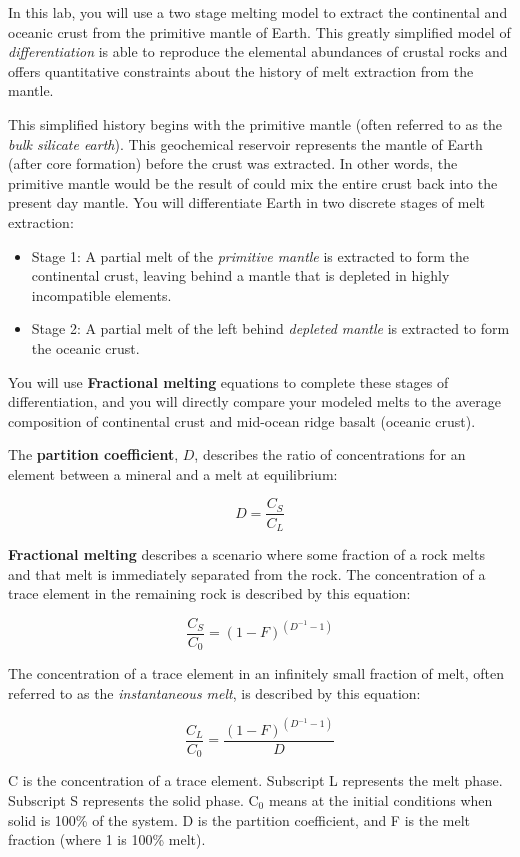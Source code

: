 \noindent In this lab, you will use a two stage melting model to extract the continental and oceanic crust from the primitive mantle of Earth. This greatly simplified model of \emph{differentiation} is able to reproduce the elemental abundances of crustal rocks and offers quantitative constraints about the history of melt extraction from the mantle.

\medskip

\noindent This simplified history begins with the primitive mantle (often referred to as the \emph{bulk silicate earth}). This geochemical reservoir represents the mantle of Earth (after core formation) before the crust was extracted. In other words, the primitive mantle would be the result of could mix the entire crust back into the present day mantle. You will differentiate Earth in two discrete stages of melt extraction:

\begin{itemize}
	\item Stage 1: A partial melt of the \emph{primitive mantle} is extracted to form the continental crust, leaving behind a mantle that is depleted in highly incompatible elements.
	\item Stage 2: A partial melt of the left behind \emph{depleted mantle} is extracted to form the oceanic crust.
\end{itemize}

\noindent You will use \textbf{Fractional melting} equations to complete these stages of differentiation, and you will directly compare your modeled melts to the average composition of continental crust and mid-ocean ridge basalt (oceanic crust).


\medskip
\noindent The \textbf{partition coefficient}, $D$, describes the ratio of concentrations for an element between a mineral and a melt at equilibrium:

$$D=\frac{C_S}{C_L}$$

\noindent \textbf{Fractional melting} describes a scenario where some fraction of a rock melts and that melt is immediately separated from the rock. The concentration of a trace element in the remaining rock is described by this equation:

$$\frac{C_S}{C_0}=(1-F)^{(D^{-1}-1)}$$

\noindent The concentration of a trace element in an infinitely small fraction of melt, often referred to as the \emph{instantaneous melt}, is described by this equation:

$$\frac{C_L}{C_0}= \frac{(1-F)^{(D^{-1}-1)}}{D}$$

\noindent C is the concentration of a trace element. Subscript L represents the melt phase. Subscript S represents the solid phase. C$_0$ means at the initial conditions when solid is 100\% of the system. D is the partition coefficient, and F is the melt fraction (where 1 is 100\% melt).
